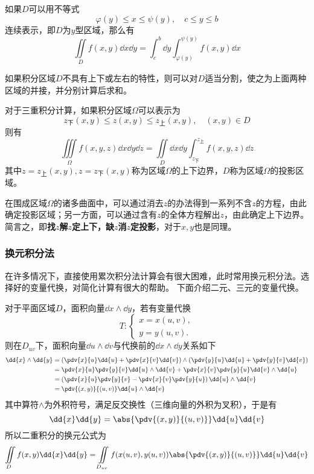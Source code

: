 如果$D$可以用不等式
\[ \varphi(y) \leq x \leq \psi(y),\quad c\leq y\leq b \]
连续表示，即$D$为$y$型区域，那么有
\begin{equation}
    \iint\limits_D f(x,y)\dd{x}\dd{y} = \int_c^b \dd{y}\int_{\varphi(y)}^{\psi(y)} f(x,y)\dd{x}
\end{equation}

如果积分区域$D$不具有上下或左右的特性，则可以对$D$适当分割，使之为上面两种区域的并接，并分别计算后求和。

对于三重积分计算，如果积分区域$\Omega$可以表示为
\[ z_\text{下}(x,y)\leq z(x,y) \leq z_\text{上}(x,y),\quad (x,y)\in D \]
则有
\begin{equation}
    \iiint\limits_\Omega f(x,y,z)\dd{x}\dd{y}\dd{z} = \iint\limits_D \dd{x}\dd{y}\int_{z_\text{下}}^{z_\text{上}}f(x,y,z)\dd{z}
\end{equation}
其中$z=z_\text{上}(x,y),z=z_\text{下}(x,y)$称为区域$\Omega$的上下边界，$D$称为区域$\Omega$的投影区域。

在围成区域$\Omega$的诸多曲面中，可以通过消去$z$的办法得到一系列不含$z$的方程，由此确定投影区域；另一方面，可以通过含有$z$的全体方程解出$z$，由此确定上下边界。
简言之，即\textbf{\textsf{找$z$解$z$定上下，缺$z$消$z$定投影}}，对于$x,y$也是同理。


\subsubsection{换元积分法}
在许多情况下，直接使用累次积分法计算会有很大困难，此时常用换元积分法。选择好的变量代换，对简化计算有很大的帮助。
下面介绍二元、三元的变量代换。

对于平面区域$D$，面积向量$\dd{x}\wedge \dd{y}$，若有变量代换
\[
    T:
    \begin{cases}
        x=x(u,v), \\
        y=y(u,v).
    \end{cases}
\]
则在$D_{uv}$下，面积向量$\dd{u}\wedge\dd{v}$与代换前的$\dd{x}\wedge\dd{y}$关系如下
\begin{align*}
    \dd{x} \wedge \dd{y}
     & = \left(\pdv{x}{u}\dd{u} + \pdv{x}{v}\dd{v}\right) \wedge \left(\pdv{y}{u}\dd{u} +\pdv{y}{v}\dd{v}\right) \\
     & = \pdv{x}{u}\pdv{y}{v}\dd{u}\wedge\dd{v} + \pdv{x}{v}\pdv{y}{u}\dd{v}\wedge\dd{u}                         \\
     & = \left(\pdv{x}{u}\pdv{y}{v} - \pdv{x}{v}\pdv{y}{u}\right)\dd{u}\wedge\dd{v}                              \\
     & = \pdv{(x,y)}{(u,v)}\dd{u}\wedge\dd{v}
\end{align*}
其中算符$\wedge$为外积符号，满足反交换性（三维向量的外积为叉积），于是有
\[ \dd{x}\dd{y} = \abs{\pdv{(x,y)}{(u,v)}}\dd{u}\dd{v} \]
所以二重积分的换元公式为
\begin{equation}
    \iint\limits_D f(x,y)\dd{x}\dd{y} = \iint\limits_{D_{uv}}f(x(u,v),y(u,v)) \abs{\pdv{(x,y)}{(u,v)}}\dd{u}\dd{v}
\end{equation}


